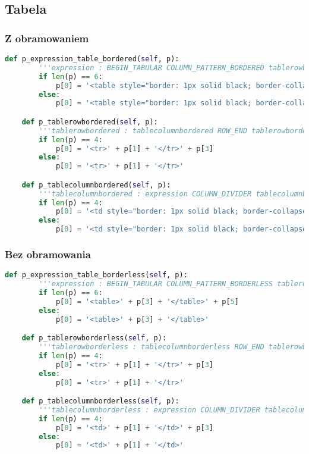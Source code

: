 \subsection{Tabela}

\subsubsection{Z obramowaniem}

\begin{lstlisting}[language={Python}, caption={Tabela z obramowaniem}, label={gramatyka-tekst}]
    def p_expression_table_bordered(self, p):
        '''expression : BEGIN_TABULAR COLUMN_PATTERN_BORDERED tablerowbordered END_TABULAR expression | BEGIN_TABULAR COLUMN_PATTERN_BORDERED tablerowbordered END_TABULAR'''
        if len(p) == 6:
            p[0] = '<table style="border: 1px solid black; border-collapse: collapse;">' + p[3] + '</table>' + p[5]
        else:
            p[0] = '<table style="border: 1px solid black; border-collapse: collapse;">' + p[3] + '</table>'

    def p_tablerowbordered(self, p):
        '''tablerowbordered : tablecolumnbordered ROW_END tablerowbordered | tablecolumnbordered'''
        if len(p) == 4:
            p[0] = '<tr>' + p[1] + '</tr>' + p[3]
        else:
            p[0] = '<tr>' + p[1] + '</tr>'

    def p_tablecolumnbordered(self, p):
        '''tablecolumnbordered : expression COLUMN_DIVIDER tablecolumnbordered | expression'''
        if len(p) == 4:
            p[0] = '<td style="border: 1px solid black; border-collapse: collapse;">' + p[1] + '</td>' + p[3]
        else:
            p[0] = '<td style="border: 1px solid black; border-collapse: collapse;">' + p[1] + '</td>'
\end{lstlisting}

\subsubsection{Bez obramowania}

\begin{lstlisting}[language={Python}, caption={Tabela bez obramowania}, label={gramatyka-tekst} ]
    def p_expression_table_borderless(self, p):
        '''expression : BEGIN_TABULAR COLUMN_PATTERN_BORDERLESS tablerowborderless END_TABULAR expression | BEGIN_TABULAR COLUMN_PATTERN_BORDERLESS tablerowborderless END_TABULAR'''
        if len(p) == 6:
            p[0] = '<table>' + p[3] + '</table>' + p[5]
        else:
            p[0] = '<table>' + p[3] + '</table>'

    def p_tablerowborderless(self, p):
        '''tablerowborderless : tablecolumnborderless ROW_END tablerowborderless | tablecolumnborderless'''
        if len(p) == 4:
            p[0] = '<tr>' + p[1] + '</tr>' + p[3]
        else:
            p[0] = '<tr>' + p[1] + '</tr>'

    def p_tablecolumnborderless(self, p):
        '''tablecolumnborderless : expression COLUMN_DIVIDER tablecolumnborderless | expression'''
        if len(p) == 4:
            p[0] = '<td>' + p[1] + '</td>' + p[3]
        else:
            p[0] = '<td>' + p[1] + '</td>'
\end{lstlisting}